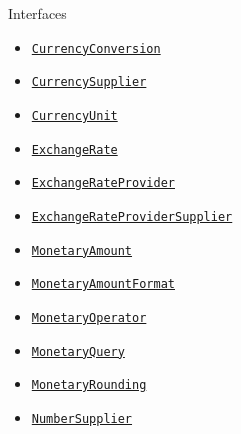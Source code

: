 \documentclass{beamer}
\newcommand{\code}[1]{\texttt{#1}}
\newcommand{\slideItems}[1]{
	\begin{itemize}
		#1
	\end{itemize}
}
\newcommand{\slide}[2]{
	\begin{frame}{#1}
		#2
	\end{frame}
}
\begin{document}
\slide{Interfaces}{
	\slideItems{
		\item \code{\href{https://github.com/JavaMoney/jsr354-api/blob/master/src/main/java/javax/money/convert/CurrencyConversion.java}{CurrencyConversion}}
		\item \code{\href{https://github.com/JavaMoney/jsr354-api/blob/master/src/main/java/javax/money/CurrencySupplier.java}{CurrencySupplier}}
		\item \code{\href{https://github.com/JavaMoney/jsr354-api/blob/master/src/main/java/javax/money/CurrencyUnit.java}{CurrencyUnit}}
		\item \code{\href{https://github.com/JavaMoney/jsr354-api/blob/master/src/main/java/javax/money/convert/ExchangeRate.java}{ExchangeRate}}
		\item \code{\href{https://github.com/JavaMoney/jsr354-api/blob/master/src/main/java/javax/money/convert/ExchangeRateProvider.java}{ExchangeRateProvider}}
		\item \code{\href{https://github.com/JavaMoney/jsr354-api/blob/master/src/main/java/javax/money/convert/ExchangeRateProviderSupplier.java}{ExchangeRateProviderSupplier}}
		\item \code{\href{https://github.com/JavaMoney/jsr354-api/blob/master/src/main/java/javax/money/MonetaryAmount.java}{MonetaryAmount}}
		\item \code{\href{https://github.com/JavaMoney/jsr354-api/blob/master/src/main/java/javax/money/format/MonetaryAmountFormat.java}{MonetaryAmountFormat}}
		\item \code{\href{https://github.com/JavaMoney/jsr354-api/blob/master/src/main/java/javax/money/MonetaryOperator.java}{MonetaryOperator}}
		\item \code{\href{https://github.com/JavaMoney/jsr354-api/blob/master/src/main/java/javax/money/MonetaryQuery.java}{MonetaryQuery}}
		\item \code{\href{https://github.com/JavaMoney/jsr354-api/blob/master/src/main/java/javax/money/MonetaryRounding.java}{MonetaryRounding}}
		\item \code{\href{https://github.com/JavaMoney/jsr354-api/blob/master/src/main/java/javax/money/NumberSupplier.java}{NumberSupplier}}
	}
}
\end{document}
